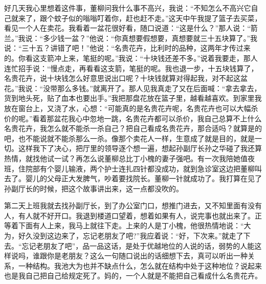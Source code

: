 \documentclass[12pt,oneside]{book}
\begin{document}
好几天我心里想着这件事，董柳问我什么事不高兴，我说：``不知怎么不高兴它自己就来了，跟个蚊子似的嗡嗡叮着你，赶也赶不走。''这天中午我提了篮子去买菜，看见一个人在卖花。我看着一盆花很好看，随口说道：``这是什么？''那人说：``箭兰。''我说：``多少钱一盆？''他说：``你真想要假想要，真想要就三十五块算了。''我说：``三十五？讲错了吧！''他说：``名贵花卉，比利时的品种，这两年才传过来的。你看这支箭冲上来，笔挺的呢。''我说：``十块钱还差不多。''说着我要走，那人连忙招手说：``慢点走，再看看这支箭，笔挺的呢。我也退一步，十五块钱算了，名贵花卉，说十块钱怎么好意思说出口呢？十块钱就算对得起我，对不起这盆花。''我说：``没带那么多钱。''就离开了。那人见我真走了又在后面喊：``拿去拿去，货到地头死，贴了血本也要出手。''我把那盘花放在篮子里，越看越喜欢。到家里我放在窗台上，又浇了水，心想：``可能真的是名贵花卉呢，名贵花卉也可以大幅杀价的呢。''看着那盆花我心中忽地一跳，名贵花卉都可以杀价，我自己总算不上什么名贵花卉，我怎么就不能杀一杀自己？把自己看成名贵花卉，那合适吗？就算是的吧，也不能说就不能杀那么一杀。像那个卖花人一样，生意成了就是目的，就是一切。这样我下了决心，把厅里的领导逐个想一遍，想起孙副厅长孙之华碰了我还算热情，就找他试一试？再怎么说董柳总比丁小槐的妻子强吧。有一次我陪她值夜班，住院部有个婴儿输液，两个护士连扎四针都没成功，就到急诊室这边把董柳叫去了。婴儿的父母正大发脾气，吵着要找院长。董柳一针就成功了。我打算在见了孙副厅长的时候，把这个故事讲出来，这一点都没吹的。

第二天上班我就去找孙副厅长，到了办公室门口，想推门进去，又不知里面有没有人，有人就不好开口。我退到楼道口望着，想着如果有人，说完事也就出来了。正等着下面有人上来，我马上就往下走。上来的人是丁小槐，他很热情地说：``大为，好久没到这边来了，忘记老朋友了吧?''我应着说：``好，下次来。''就走了下去。``忘记老朋友了吧''，品一品这话，是处于优越地位的人说的话，弱势的人能这样说吗，谁跟你是老朋友？这么一句随口说出的话细想下去，真可以听出一种关系，一种结构。我池大为也并不缺点什么，怎么就在结构中处于这种地位？说起来也是我自己把自己给规定死了。妈的，一个人就是不能把自己看成什么名贵花卉。
\end{document}
